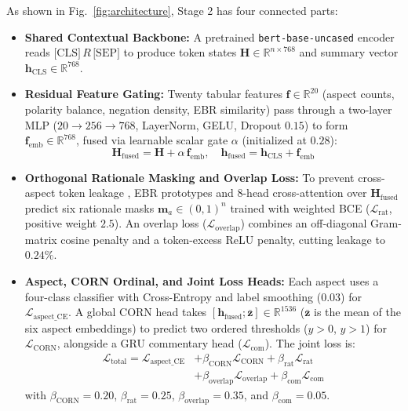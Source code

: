 \documentclass{llncs}
\begin{document}
As shown in Fig.~\ref{fig:architecture}, Stage 2 has four connected parts:
\begin{itemize}
\item \textbf{Shared Contextual Backbone:} A pretrained \texttt{bert-base-uncased} encoder reads $\text{[CLS]} \, R \, \text{[SEP]}$ to produce token states $\mathbf{H} \in \mathbb{R}^{n \times 768}$ and summary vector $\mathbf{h}_{\text{CLS}} \in \mathbb{R}^{768}$.
\item \textbf{Residual Feature Gating:} Twenty tabular features $\mathbf{f} \in \mathbb{R}^{20}$ (aspect counts, polarity balance, negation density, EBR similarity) pass through a two-layer MLP ($20 \rightarrow 256 \rightarrow 768$, LayerNorm, GELU, Dropout $0.15$) to form $\mathbf{f}_{\text{emb}} \in \mathbb{R}^{768}$, fused via learnable scalar gate $\alpha$ (initialized at $0.28$):
\begin{equation}
\mathbf{H}_{\text{fused}} = \mathbf{H} + \alpha \, \mathbf{f}_{\text{emb}}, \quad \mathbf{h}_{\text{fused}} = \mathbf{h}_{\text{CLS}} + \mathbf{f}_{\text{emb}}
\end{equation}
\item \textbf{Orthogonal Rationale Masking and Overlap Loss:} To prevent cross-aspect token leakage \cite{ref30_tran2026}, EBR prototypes and 8-head cross-attention over $\mathbf{H}_{\text{fused}}$ predict six rationale masks $\mathbf{m}_a \in (0, 1)^n$ trained with weighted BCE ($\mathcal{L}_{\text{rat}}$, positive weight $2.5$). An overlap loss ($\mathcal{L}_{\text{overlap}}$) combines an off-diagonal Gram-matrix cosine penalty and a token-excess ReLU penalty, cutting leakage to $0.24\%$.
\item \textbf{Aspect, CORN Ordinal, and Joint Loss Heads:} Each aspect uses a four-class classifier with Cross-Entropy and label smoothing ($0.03$) for $\mathcal{L}_{\text{aspect\_CE}}$. A global CORN head takes $[\mathbf{h}_{\text{fused}}; \bar{\mathbf{z}}] \in \mathbb{R}^{1536}$ ($\bar{\mathbf{z}}$ is the mean of the six aspect embeddings) to predict two ordered thresholds ($y > 0$, $y > 1$) for $\mathcal{L}_{\text{CORN}}$, alongside a GRU commentary head ($\mathcal{L}_{\text{com}}$). The joint loss is:
\begin{equation}
\begin{split}
\mathcal{L}_{\text{total}} = \mathcal{L}_{\text{aspect\_CE}} &+ \beta_{\text{CORN}} \mathcal{L}_{\text{CORN}} + \beta_{\text{rat}} \mathcal{L}_{\text{rat}} \\
&+ \beta_{\text{overlap}} \mathcal{L}_{\text{overlap}} + \beta_{\text{com}} \mathcal{L}_{\text{com}}
\end{split}
\end{equation}
with $\beta_{\text{CORN}} = 0.20$, $\beta_{\text{rat}} = 0.25$, $\beta_{\text{overlap}} = 0.35$, and $\beta_{\text{com}} = 0.05$.
\end{itemize}
\FloatBarrier
\end{document}
